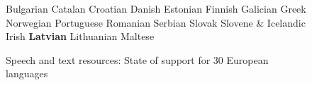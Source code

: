 \begin{figure}[b]
\begin{tabular}
Bulgarian \newline 
Catalan \newline 
Croatian \newline 
Danish \newline 
Estonian \newline 
Finnish \newline 
Galician \newline 
Greek \newline 
Norwegian \newline 
Portuguese \newline 
Romanian \newline 
Serbian \newline 
Slovak \newline 
Slovene\newline
&  \vspace*{0.5mm}
    Icelandic \newline 
 Irish \newline 
 \textbf{Latvian} \newline 
Lithuanian \newline 
 Maltese \\
  \end{tabular}
  \caption{Speech and text resources: State of support for 30 European languages}  
   \label{fig:resources_cluster_en}
\end{figure}

\clearpage


